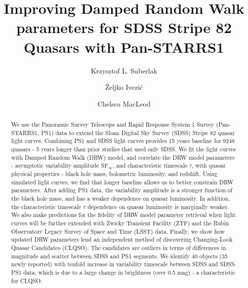 \documentclass[twocolumn]{aastex62}
\begin{document}
\title{Improving Damped Random Walk parameters for SDSS Stripe 82 Quasars with Pan-STARRS1}


\author[0000-0002-9589-1306]{Krzysztof L. Suberlak}


\author[0000-0001-5250-2633]{\v{Z}eljko Ivezi\'c}


\author[0000-0003-3422-2202]{Chelsea MacLeod}


\begin{abstract}

We use the Panoramic Survey Telescope and Rapid Response System 1 Survey (Pan-STARRS1, PS1) data to extend  the Sloan Digital Sky Survey (SDSS) Stripe 82 quasar light curves. Combining PS1 and SDSS light curves provides 15 years baseline for 9248 quasars - 5 years longer than prior studies that used only SDSS. We fit the light curves with Damped Random Walk (DRW) model, and correlate the DRW model parameters -  asymptotic variability amplitude SF$_{\infty}$, and characteristic timescale $\tau$, with quasar physical properties - black hole mass, bolometric luminosity, and redshift. Using simulated light curves, we find that longer baseline allows us to better constrain DRW parameters. After adding PS1 data, the variability amplitude is a stronger function of the black hole mass, and has a weaker dependence on quasar luminosity. In addition, the characteristic timescale $\tau$ dependence on quasar luminosity is marginally weaker. We also make predictions for the fidelity of DRW model parameter retrieval when light curves will be further extended with Zwicky Transient Facility (ZTF) and the Rubin Observatory Legacy Survey of Space and Time (LSST) data. Finally, we show how updated DRW parameters lend an independent method of discovering Changing-Look Quasar Candidates (CLQSO). The candidates are outliers in terms of differences in magnitude and scatter between SDSS and PS1 segments. We identify 40 objects (35 newly reported) with tenfold increase in variability timescale between SDSS and SDSS-PS1 data, which is due to a large change in brightness (over 0.5 mag) - a characteristic for CLQSO. 


\end{abstract}
\end{document}
